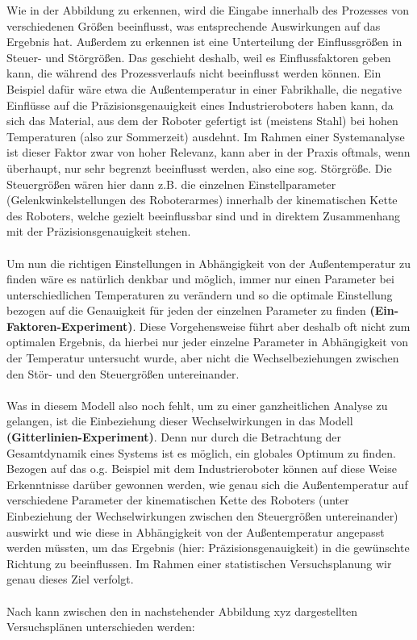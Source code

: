 \documentclass[
fontsize=10pt, 
listof = totoc,
parskip = half	
]{report}
\begin{document}
\noindent Wie in der Abbildung zu erkennen, wird die Eingabe innerhalb des Prozesses von verschiedenen Größen beeinflusst, was entsprechende Auswirkungen auf das Ergebnis hat. Außerdem zu erkennen ist eine Unterteilung der Einflussgrößen in Steuer- und Störgrößen. Das geschieht deshalb, weil es Einflussfaktoren geben kann, die während des Prozessverlaufs nicht beeinflusst werden können. Ein Beispiel dafür wäre etwa die Außentemperatur in einer Fabrikhalle, die negative Einflüsse auf die Präzisionsgenauigkeit eines Industrieroboters haben kann, da sich das Material, aus dem der Roboter gefertigt ist (meistens Stahl) bei hohen Temperaturen (also zur Sommerzeit) ausdehnt. Im Rahmen einer Systemanalyse ist dieser Faktor zwar von hoher Relevanz, kann aber in der Praxis oftmals, wenn überhaupt, nur sehr begrenzt beeinflusst werden, also eine sog. Störgröße. Die Steuergrößen wären hier dann z.B. die einzelnen Einstellparameter (Gelenkwinkelstellungen des Roboterarmes) innerhalb der kinematischen Kette des Roboters, welche gezielt beeinflussbar sind und in direktem Zusammenhang mit der Präzisionsgenauigkeit stehen.
\\\\
Um nun die richtigen Einstellungen in Abhängigkeit von der Außentemperatur zu finden wäre es natürlich denkbar und möglich, immer nur einen Parameter bei unterschiedlichen Temperaturen zu verändern und so die optimale Einstellung bezogen auf die Genauigkeit für jeden der einzelnen Parameter zu finden \textbf{(Ein-Faktoren-Experiment)}. Diese Vorgehensweise führt aber deshalb oft nicht zum optimalen Ergebnis, da hierbei nur jeder einzelne Parameter in Abhängigkeit von der Temperatur untersucht wurde, aber nicht die Wechselbeziehungen zwischen den Stör- und den Steuergrößen untereinander.
\\\\
\noindent Was in diesem Modell also noch fehlt, um zu einer ganzheitlichen Analyse zu gelangen, ist die Einbeziehung dieser Wechselwirkungen  in das Modell \textbf{(Gitterlinien-Experiment)}. Denn nur durch die Betrachtung der Gesamtdynamik eines Systems ist es möglich, ein globales Optimum zu finden. Bezogen auf das o.g. Beispiel mit dem Industrieroboter können auf diese Weise Erkenntnisse darüber gewonnen werden, wie genau sich die Außentemperatur auf verschiedene Parameter der kinematischen Kette des Roboters (unter Einbeziehung der Wechselwirkungen zwischen den Steuergrößen untereinander) auswirkt und wie diese in Abhängigkeit von der Außentemperatur angepasst werden müssten, um das Ergebnis (hier: Präzisionsgenauigkeit) in die gewünschte Richtung zu beeinflussen. Im Rahmen einer statistischen Versuchsplanung wir genau dieses Ziel verfolgt.
\\\\
Nach \cite{schiefer_2018} kann zwischen den in nachstehender Abbildung xyz dargestellten Versuchsplänen unterschieden werden:
\end{document}
